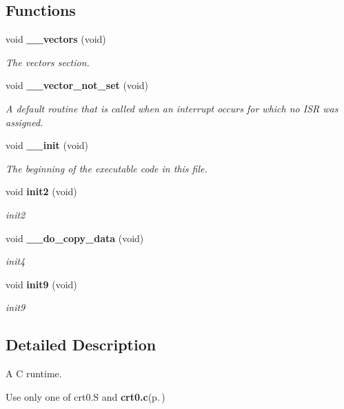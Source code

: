 \subsection*{Functions}
\begin{CompactItemize}
\item 
void {\bf \_\-\_\-vectors} (void)
\begin{CompactList}\small\item\em The vectors section. \item\end{CompactList}\item 
void {\bf \_\-\_\-vector\_\-not\_\-set} (void)
\begin{CompactList}\small\item\em A default routine that is called when an interrupt occurs for which no ISR was assigned. \item\end{CompactList}\item 
void {\bf \_\-\_\-init} (void)
\begin{CompactList}\small\item\em The beginning of the executable code in this file. \item\end{CompactList}\item 
void {\bf init2} (void)
\begin{CompactList}\small\item\em init2 \item\end{CompactList}\item 
void {\bf \_\-\_\-do\_\-copy\_\-data} (void)
\begin{CompactList}\small\item\em init4 \item\end{CompactList}\item 
void {\bf init9} (void)
\begin{CompactList}\small\item\em init9 \item\end{CompactList}\end{CompactItemize}


\subsection{Detailed Description}
A C runtime. 

Use only one of crt0.S and {\bf crt0.c}{\rm (p.\,\pageref{crt0_8c})}

